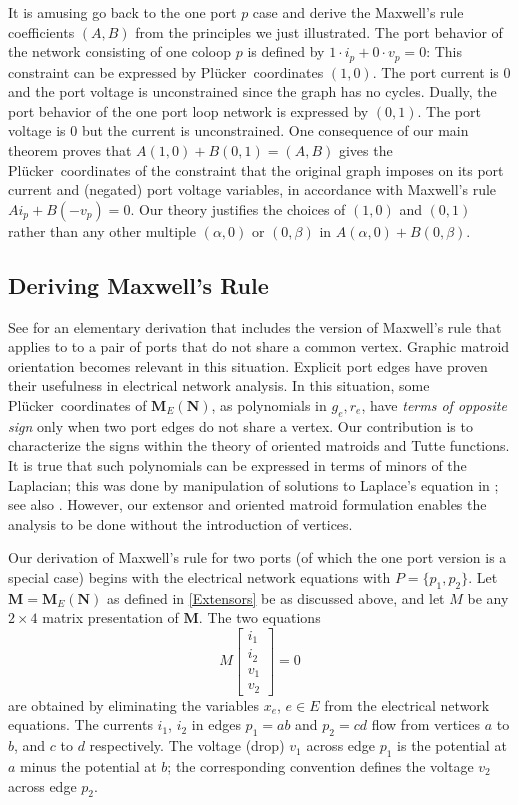 \documentclass[12pt]{article}
\theoremstyle{definition}
\newcommand{\ext}[1]{\ensuremath{\mathbf{#1}}}
\newcommand{\Plucker}{Pl\"{u}cker\ }
\begin{document}
It is amusing go back to the one port $p$ case and 
derive 
the Maxwell's rule coefficients $(A,B)$ from the principles we just
illustrated.
The port behavior of the network consisting of one coloop $p$ is
defined by $1\cdot i_p + 0\cdot v_p =0$: This constraint 
can be expressed by 
\Plucker coordinates
$(1,0)$.  The port current is 0 and the port voltage is
unconstrained since the graph has no cycles.  
Dually, the port behavior of the one port loop network
is expressed by $(0,1)$.  The port voltage is 0 but the current is 
unconstrained.  One consequence of our main theorem proves that
$A(1,0)+B(0,1)=(A,B)$ gives the  
\Plucker coordinates of the constraint that the original graph
imposes on its port current and (negated) port voltage variables,
in accordance with Maxwell's rule $Ai_p + B(-v_p) = 0$.
Our theory justifies the choices of $(1,0)$ and $(0,1)$
rather than any other multiple $(\alpha,0)$ or $(0,\beta)$ in
$A(\alpha,0)+B(0,\beta)$.

\subsection{Deriving Maxwell's Rule}

See \cite{ChensBook}
for an elementary derivation that includes the
version of Maxwell's rule\cite{MaxR} that applies to 
to a pair of
ports that do not share a common vertex.  
Graphic matroid orientation becomes
relevant in this situation.
Explicit port edges
have proven their usefulness in electrical network 
analysis\cite[]{LinNonLinCircuitsBook}.
In this situation,  some
\Plucker coordinates of 
$\ext{M}_E(\ext{N})$, as polynomials in $g_e,r_e$, have
\emph{terms of opposite sign} only when two port edges do not share a 
vertex.  Our contribution is to characterize the signs within the theory of 
oriented matroids and Tutte functions.
It is true that such polynomials can be expressed in terms
of minors of the Laplacian; this was done by manipulation
of solutions to Laplace's equation in \cite{BSST}; see also \cite{TutteBook}.
However, our extensor and oriented matroid formulation enables 
the analysis to be done without the introduction of vertices.

Our derivation of Maxwell's rule for two ports (of which the
one port version is a special case) begins with the electrical network
equations with $P=\{p_1,p_2\}$.  Let $\ext{M}=\ext{M}_E(\ext{N})$ as defined
in \textsection \ref{Extensors} be as discussed above, and let $M$ be
any $2\times 4$ matrix presentation of $\ext{M}$.  The
two equations
\[
M\left[\begin{array}{c}i_1 \\  i_2  \\  v_1 \\  v_2\end{array}\right]
= 0
\]
are obtained by eliminating the variables $x_e$, $e\in E$ from the
electrical network equations.  The currents $i_1$, $i_2$ in edges
$p_1=ab$ and $p_2=cd$ flow from vertices $a$ to $b$, and $c$ to $d$
respectively.  The voltage (drop) $v_1$ across edge $p_1$ is the 
potential at $a$ minus the potential at $b$; the corresponding
convention defines the voltage $v_2$ across edge $p_2$.  
\end{document}
